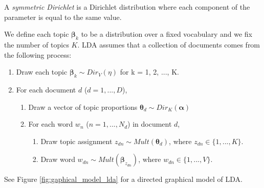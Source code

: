 \documentclass{article}
\begin{document}
A \textit{symmetric Dirichlet} is a Dirichlet distribution where each component of the parameter is equal to the same value.

We define each topic $\boldsymbol{\beta}_k$ to be a distribution over a fixed vocabulary and we fix the number of topics $K$. LDA assumes that a collection of documents comes from the following process:

\begin{enumerate}
  \item Draw each topic $\boldsymbol{\beta}_k \sim Dir_V(\eta)$ for k = 1, 2, ..., K.
  \item For each document $d$ ($d = 1, ..., D$),
  \begin{enumerate}
    \item Draw a vector of topic proportions $\boldsymbol{\theta}_d \sim Dir_K(\boldsymbol{\alpha})$
    \item For each word $w_n$ ($n = 1, ..., N_d$) in document $d$,
    \begin{enumerate}
      \item Draw topic assignment $z_{dn} \sim Mult(\boldsymbol{\theta}_d)$, where $z_{dn} \in \{1, ..., K\}$.
      \item Draw word $w_{dn} \sim Mult(\boldsymbol{\beta}_{z_{dn}})$, where $w_{dn} \in \{1, ..., V\}$.
    \end{enumerate}
  \end{enumerate}
\end{enumerate}

See Figure \ref{fig:gaphical_model_lda} for a directed graphical model of LDA.
\end{document}
